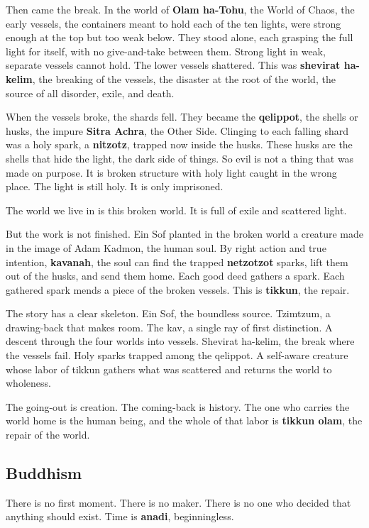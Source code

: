 Then came the break. In the world of \textbf{Olam ha-Tohu}, the World of Chaos, the
early vessels, the containers meant to hold each of the ten lights, were strong
enough at the top but too weak below. They stood alone, each grasping the full light
for itself, with no give-and-take between them. Strong light in weak, separate
vessels cannot hold. The lower vessels shattered. This was
\textbf{shevirat ha-kelim}, the breaking of the vessels, the disaster at the root of
the world, the source of all disorder, exile, and death.

When the vessels broke, the shards fell. They became the \textbf{qelippot}, the
shells or husks, the impure \textbf{Sitra Achra}, the Other Side. Clinging to each
falling shard was a holy spark, a \textbf{nitzotz}, trapped now inside the husks.
These husks are the shells that hide the light, the dark side of things. So evil is
not a thing that was made on purpose. It is broken structure with holy light caught
in the wrong place. The light is still holy. It is only imprisoned.

The world we live in is this broken world. It is full of exile and scattered light.

But the work is not finished. Ein Sof planted in the broken world a creature made in
the image of Adam Kadmon, the human soul. By right action and true intention,
\textbf{kavanah}, the soul can find the trapped \textbf{netzotzot} sparks, lift them
out of the husks, and send them home. Each good deed gathers a spark. Each gathered
spark mends a piece of the broken vessels. This is \textbf{tikkun}, the repair.

The story has a clear skeleton. Ein Sof, the boundless source. Tzimtzum, a
drawing-back that makes room. The kav, a single ray of first distinction. A descent
through the four worlds into vessels. Shevirat ha-kelim, the break where the vessels
fail. Holy sparks trapped among the qelippot. A self-aware creature whose labor of
tikkun gathers what was scattered and returns the world to wholeness.

The going-out is creation. The coming-back is history. The one who carries the world
home is the human being, and the whole of that labor is \textbf{tikkun olam}, the
repair of the world.

\subsection{Buddhism}

There is no first moment. There is no maker. There is no one who decided that
anything should exist. Time is \textbf{anadi}, beginningless.

